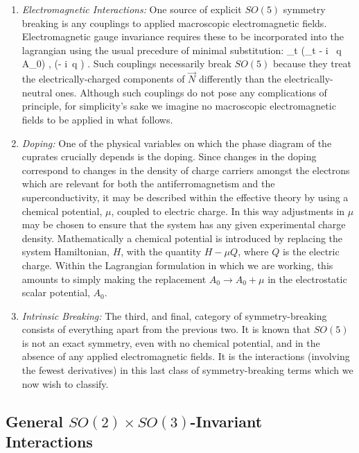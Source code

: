 \documentclass[12pt,epsf]{report}
\begin{document}
\begin{enumerate}

\item
{\it Electromagnetic Interactions:} One source of explicit
$SO(5)$ symmetry breaking is any couplings to applied
macroscopic electromagnetic fields. Electromagnetic gauge
invariance requires these to be incorporated into the
lagrangian using the usual precedure of minimal
substitution:
%
\eq
\label{minsubst}
\partial_t \psi \to (\partial_t - i \, q \; A_0) \psi,
\qquad \nabla \psi \to (\nabla - i\, q \; \Bfa) \psi.
\eeq
%
Such couplings necessarily break $SO(5)$ because they treat
the electrically-charged components of $\vec N$ differently
than the electrically-neutral ones. Although such couplings
do not pose any complications of principle, for simplicity's
sake we imagine no macroscopic electromagnetic fields to be
applied in what follows.

\item
{\it Doping:}
One of the physical variables on which the phase diagram of
the cuprates crucially depends is the doping. Since changes 
in the doping correspond to changes in the density of charge
carriers amongst the electrons which are relevant 
for both the antiferromagnetism and the superconductivity,
it may be described within the effective theory by using a 
chemical potential, $\mu$, coupled to electric charge. 
In this way adjustments in $\mu$ may be chosen to
ensure that the system has any given experimental charge
density. Mathematically a chemical potential is introduced 
by replacing the system Hamiltonian, $H$, with the 
quantity $H - \mu Q$, where $Q$ is the electric
charge. Within the Lagrangian formulation in which
we are working, this amounts to simply making 
the replacement $A_0 \to A_0 + \mu$ in the electrostatic
scalar potential, $A_0$.

\item
{\it Intrinsic Breaking:} The third, and final, category of
symmetry-breaking consists of everything apart from the
previous two. It is known that $SO(5)$ is not an exact
symmetry, even with no chemical potential, and in the
absence of any applied electromagnetic fields. It is the
interactions (involving the fewest derivatives) in this
last class of symmetry-breaking terms which we now wish to
classify.

\end{enumerate}

\subsection{General $SO(2) \times SO(3)$-Invariant
Interactions}
\end{document}
